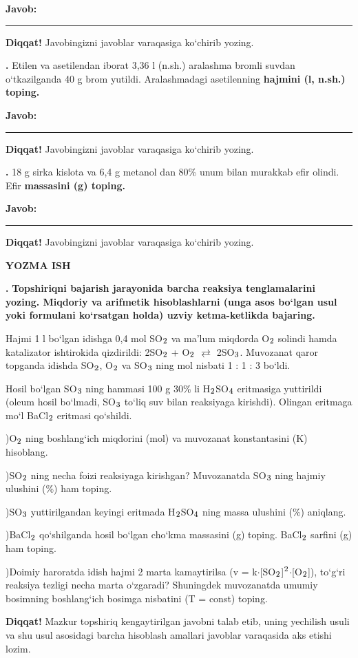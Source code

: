 \documentclass[11pt,a4paper]{article}
\renewcommand{\textsubscript}[1]{\ensuremath{_{\text{\fontsize{8}{8}\selectfont #1}}}}
\renewcommand{\textsuperscript}[1]{\ensuremath{^{\text{\fontsize{8}{8}\selectfont #1}}}}
\newcommand{\qn}[1]{\textbf{\fontsize{11.5}{13}\selectfont #1}}
\newcommand{\qsep}{\par\vspace{1pt}\noindent\rule{0pt}{0.4pt}\par\vspace{5pt}}
\newcommand{\diqqat}[1]{\par\smallskip\noindent\textbf{Diqqat!} #1\par\medskip}
\newcommand{\javob}{\par\smallskip\noindent\textbf{Javob:} \rule[-2pt]{7.5cm}{0.4pt}\par\smallskip\noindent\textbf{Diqqat!} Javobingizni javoblar varaqasiga ko`chirib yozing.\par\medskip}
\begin{document}
\javob\qsep
\noindent\qn{39.} Etilen va asetilendan iborat 3,36 l (n.sh.) aralashma bromli suvdan o`tkazilganda 40 g brom yutildi. Aralashmadagi asetilenning \textbf{hajmini (l, n.sh.) toping.}
\javob\qsep
\noindent\qn{40.} 18 g sirka kislota va 6,4 g metanol dan 80\% unum bilan murakkab efir olindi. Efir \textbf{massasini (g) toping.}
\javob\qsep
\par\bigskip\begin{center}\textbf{\fontsize{13}{15}\selectfont YOZMA ISH}\end{center}
\noindent\qn{41.} \textbf{Topshiriqni bajarish jarayonida barcha reaksiya tenglamalarini yozing. Miqdoriy va arifmetik hisoblashlarni (unga asos bo`lgan usul yoki formulani ko`rsatgan holda) uzviy ketma-ketlikda bajaring.}\par\smallskip
Hajmi 1 l bo`lgan idishga 0,4 mol SO\textsubscript{2} va ma'lum miqdorda O\textsubscript{2} solindi hamda katalizator ishtirokida qizdirildi: 2SO\textsubscript{2} + O\textsubscript{2} $\rightleftarrows$ 2SO\textsubscript{3}. Muvozanat qaror topganda idishda SO\textsubscript{2}, O\textsubscript{2} va SO\textsubscript{3} ning mol nisbati 1 : 1 : 3 bo`ldi.\par
Hosil bo`lgan SO\textsubscript{3} ning hammasi 100 g 30\% li H\textsubscript{2}SO\textsubscript{4} eritmasiga yuttirildi (oleum hosil bo`lmadi, SO\textsubscript{3} to`liq suv bilan reaksiyaga kirishdi). Olingan eritmaga mo`l BaCl\textsubscript{2} eritmasi qo`shildi.\par
{})O\textsubscript{2} ning boshlang`ich miqdorini (mol) va muvozanat konstantasini (K) hisoblang.\par
{})SO\textsubscript{2} ning necha foizi reaksiyaga kirishgan? Muvozanatda SO\textsubscript{3} ning hajmiy ulushini (\%) ham toping.\par
{})SO\textsubscript{3} yuttirilgandan keyingi eritmada H\textsubscript{2}SO\textsubscript{4} ning massa ulushini (\%) aniqlang.\par
{})BaCl\textsubscript{2} qo`shilganda hosil bo`lgan cho`kma massasini (g) toping. BaCl\textsubscript{2} sarfini (g) ham toping.\par
{})Doimiy haroratda idish hajmi 2 marta kamaytirilsa (v = k$\cdot$[SO\textsubscript{2}]\textsuperscript{2}$\cdot$[O\textsubscript{2}]), to`g`ri reaksiya tezligi necha marta o`zgaradi? Shuningdek muvozanatda umumiy bosimning boshlang`ich bosimga nisbatini (T = const) toping.\par
\diqqat{Mazkur topshiriq kengaytirilgan javobni talab etib, uning yechilish usuli va shu usul asosidagi barcha hisoblash amallari javoblar varaqasida aks etishi lozim.}\qsep
\end{document}
